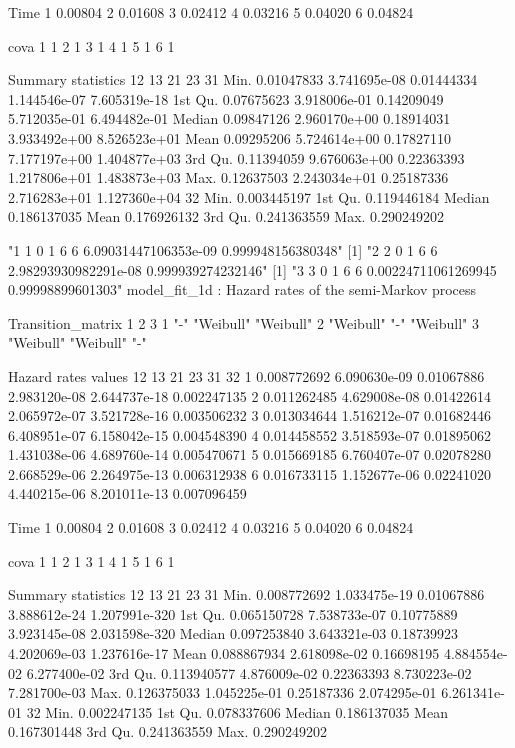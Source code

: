\documentclass[11pt,a4paper]{article}
\begin{document}
\begin{enumerate}
\begin{Schunk}
\begin{Soutput}
     Time
1 0.00804
2 0.01608
3 0.02412
4 0.03216
5 0.04020
6 0.04824

  cova
1    1
2    1
3    1
4    1
5    1
6    1

Summary statistics
                12           13         21           23           31
Min.    0.01047833 3.741695e-08 0.01444334 1.144546e-07 7.605319e-18
1st Qu. 0.07675623 3.918006e-01 0.14209049 5.712035e-01 6.494482e-01
Median  0.09847126 2.960170e+00 0.18914031 3.933492e+00 8.526523e+01
Mean    0.09295206 5.724614e+00 0.17827110 7.177197e+00 1.404877e+03
3rd Qu. 0.11394059 9.676063e+00 0.22363393 1.217806e+01 1.483873e+03
Max.    0.12637503 2.243034e+01 0.25187336 2.716283e+01 1.127360e+04
                 32
Min.    0.003445197
1st Qu. 0.119446184
Median  0.186137035
Mean    0.176926132
3rd Qu. 0.241363559
Max.    0.290249202
\end{Soutput}
\begin{Soutput}
[1] "1 1 0 1 6 6 6.09031447106353e-09 0.999948156380348"
[1] "2 2 0 1 6 6 2.98293930982291e-08 0.999939274232146"
[1] "3 3 0 1 6 6 0.00224711061269945 0.99998899601303"
model_fit_1d  : Hazard rates of the semi-Markov process

Transition_matrix
  1         2         3        
1 "-"       "Weibull" "Weibull"
2 "Weibull" "-"       "Weibull"
3 "Weibull" "Weibull" "-"      

Hazard rates values 
           12           13         21           23           31          32
1 0.008772692 6.090630e-09 0.01067886 2.983120e-08 2.644737e-18 0.002247135
2 0.011262485 4.629008e-08 0.01422614 2.065972e-07 3.521728e-16 0.003506232
3 0.013034644 1.516212e-07 0.01682446 6.408951e-07 6.158042e-15 0.004548390
4 0.014458552 3.518593e-07 0.01895062 1.431038e-06 4.689760e-14 0.005470671
5 0.015669185 6.760407e-07 0.02078280 2.668529e-06 2.264975e-13 0.006312938
6 0.016733115 1.152677e-06 0.02241020 4.440215e-06 8.201011e-13 0.007096459

     Time
1 0.00804
2 0.01608
3 0.02412
4 0.03216
5 0.04020
6 0.04824

  cova
1    1
2    1
3    1
4    1
5    1
6    1

Summary statistics
                 12           13         21           23            31
Min.    0.008772692 1.033475e-19 0.01067886 3.888612e-24 1.207991e-320
1st Qu. 0.065150728 7.538733e-07 0.10775889 3.923145e-08 2.031598e-320
Median  0.097253840 3.643321e-03 0.18739923 4.202069e-03  1.237616e-17
Mean    0.088867934 2.618098e-02 0.16698195 4.884554e-02  6.277400e-02
3rd Qu. 0.113940577 4.876009e-02 0.22363393 8.730223e-02  7.281700e-03
Max.    0.126375033 1.045225e-01 0.25187336 2.074295e-01  6.261341e-01
                 32
Min.    0.002247135
1st Qu. 0.078337606
Median  0.186137035
Mean    0.167301448
3rd Qu. 0.241363559
Max.    0.290249202
\end{Soutput}
\end{Schunk}


\end{enumerate}
\end{document}
